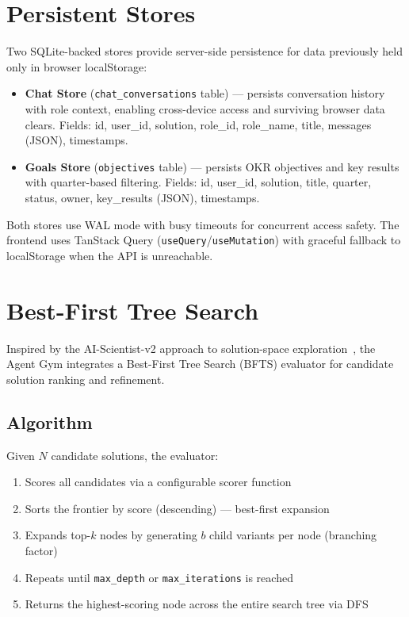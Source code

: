 \documentclass[11pt,a4paper]{article}
\begin{document}
\section{Persistent Stores}
\label{sec:stores}

Two SQLite-backed stores provide server-side persistence for data previously held only in browser localStorage:

\begin{itemize}[noitemsep]
    \item \textbf{Chat Store} (\texttt{chat\_conversations} table) --- persists conversation history with role context, enabling cross-device access and surviving browser data clears. Fields: id, user\_id, solution, role\_id, role\_name, title, messages (JSON), timestamps.
    \item \textbf{Goals Store} (\texttt{objectives} table) --- persists OKR objectives and key results with quarter-based filtering. Fields: id, user\_id, solution, title, quarter, status, owner, key\_results (JSON), timestamps.
\end{itemize}

Both stores use WAL mode with busy timeouts for concurrent access safety. The frontend uses TanStack Query (\texttt{useQuery}/\texttt{useMutation}) with graceful fallback to localStorage when the API is unreachable.

\section{Best-First Tree Search}
\label{sec:bfts}

Inspired by the AI-Scientist-v2 approach to solution-space exploration~\citep{aiscientistv2}, the Agent Gym integrates a Best-First Tree Search (BFTS) evaluator for candidate solution ranking and refinement.

\subsection{Algorithm}

Given $N$ candidate solutions, the evaluator:
\begin{enumerate}[noitemsep]
    \item Scores all candidates via a configurable scorer function
    \item Sorts the frontier by score (descending) --- best-first expansion
    \item Expands top-$k$ nodes by generating $b$ child variants per node (branching factor)
    \item Repeats until \texttt{max\_depth} or \texttt{max\_iterations} is reached
    \item Returns the highest-scoring node across the entire search tree via DFS
\end{enumerate}
\end{document}
